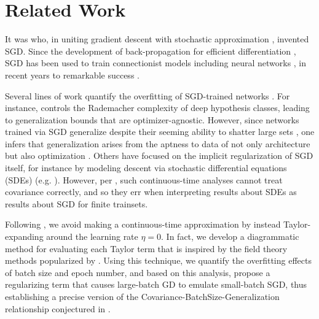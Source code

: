 \documentclass{article}
\begin{document}

\section{Related Work}
    It was \citet{ki52} who, in uniting gradient descent \citep{ca47} with
    stochastic approximation \citep{ro51}, invented SGD.  Since the development
    of back-propagation for efficient differentiation \citep{we74}, SGD
    has been used to train connectionist models including neural
    networks \citep{bo91}, in recent years to remarkable success \citep{le15}.

    Several lines of work quantify the overfitting of SGD-trained networks
    \citep{ne17a}.  For instance, \citet{ba17} controls the Rademacher
    complexity of deep hypothesis classes, leading to generalization bounds
    that are optimizer-agnostic.  However, since networks trained via SGD
    generalize despite their seeming ability to shatter large sets
    \citep{zh17}, one infers that generalization arises from the aptness to
    data of not only architecture but also optimization \citep{ne17b}.  Others
    have focused on the implicit regularization of SGD itself, for instance by
    modeling descent via stochastic differential equations (SDEs) (e.g.
    \citet{ch18}).  However, per \citet{ya19}, such continuous-time analyses
    cannot treat covariance correctly, and so they err when interpreting
    results about SDEs as results about SGD for finite trainsets.

    Following \citet{ro18}, we avoid making a continuous-time approximation by
    instead Taylor-expanding around the learning rate $\eta=0$.  In fact, we
    develop a diagrammatic method for evaluating each Taylor term that is
    inspired by the field theory methods popularized by \citet{dy49a}.  Using
    this technique, we quantify the overfitting effects of batch size and epoch
    number, and based on this analysis, propose a regularizing term that causes
    large-batch GD to emulate small-batch SGD, thus establishing a precise
    version of the Covariance-BatchSize-Generalization relationship conjectured
    in \citet{ja18}.  
    
\end{document}
